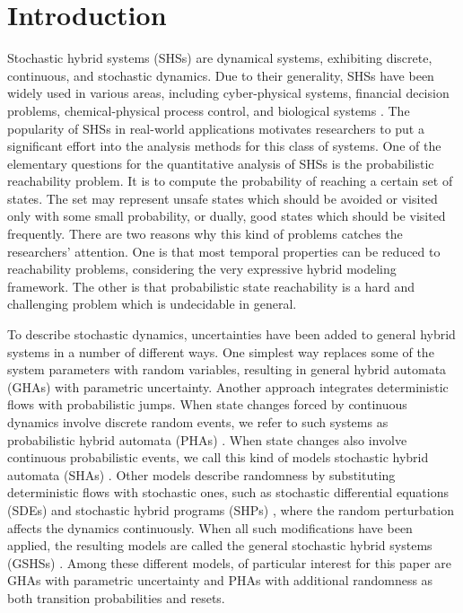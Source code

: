 \section{Introduction} 
Stochastic hybrid systems (SHSs) are dynamical systems, exhibiting discrete, continuous, and stochastic dynamics. Due to their generality, SHSs have been widely used in various areas, including cyber-physical systems, financial decision problems, chemical-physical process control, and biological systems \cite{blom2006stochastic, clarke2011statistical}. The popularity of SHSs in real-world applications motivates researchers to put a significant effort into the analysis methods for this class of systems. One of the elementary questions for the quantitative analysis of SHSs is the probabilistic reachability problem. It is to compute the probability of reaching a certain set of states. The set may represent unsafe states which should be avoided or visited only with some small probability, or dually, good states which should be visited frequently. There are two reasons why this kind of problems catches the researchers' attention. One is that most temporal properties can be reduced to reachability problems, considering the very expressive hybrid modeling framework. The other is that probabilistic state reachability is a hard and challenging problem which is undecidable in general. 

To describe stochastic dynamics, uncertainties have been added to general hybrid systems in a number of different ways. One simplest way replaces some of the system parameters with random variables, resulting in general hybrid automata (GHAs) with parametric uncertainty. Another approach integrates deterministic flows with probabilistic jumps. When state changes forced by continuous dynamics involve discrete random events, we refer to such systems as probabilistic hybrid automata (PHAs) \cite{sproston2000decidable}. When state changes also involve continuous probabilistic events, we call this kind of models stochastic hybrid automata (SHAs) \cite{franzle2011measurability}. Other models describe randomness by substituting deterministic flows with stochastic ones, such as stochastic differential equations (SDEs) \cite{ludwiga1974sde} and stochastic hybrid programs (SHPs) \cite{platzer2011stochastic}, where the random perturbation affects the dynamics continuously. When all such modifications have been applied, the resulting models are called the general stochastic hybrid systems (GSHSs) \cite{hu2000towards}. Among these different models, of particular interest for this paper are GHAs with parametric uncertainty and PHAs with additional randomness as both transition probabilities and resets. 


